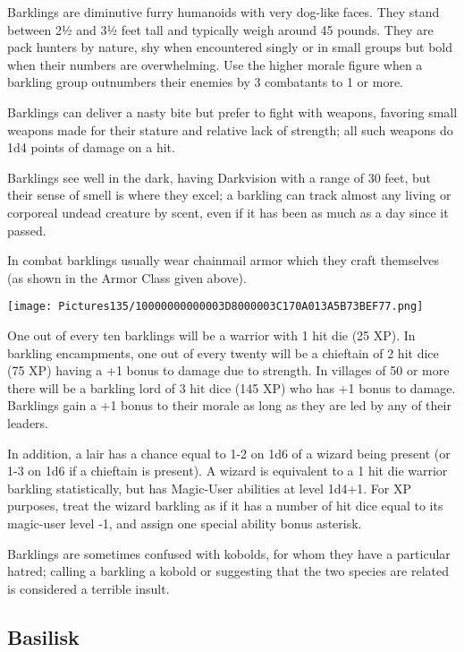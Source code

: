 \documentclass[a4paper,twoside,openany,10pt]{book}
\begin{document}
\begin{multicols}{2}
Barklings are diminutive furry humanoids with very dog-like faces. They stand between 2½ and 3½ feet tall and typically weigh around 45 pounds. They are pack hunters by nature, shy when encountered singly or in small groups but bold when their numbers are overwhelming. Use the higher morale figure when a barkling group outnumbers their enemies by 3 combatants to 1 or more.

Barklings can deliver a nasty bite but prefer to fight with weapons, favoring small weapons made for their stature and relative lack of strength; all such weapons do 1d4 points of damage on a hit. 

Barklings see well in the dark, having Darkvision with a range of 30 feet, but their sense of smell is where they excel; a barkling can track almost any living or corporeal undead creature by scent, even if it has been as much as a day since it passed.

In combat barklings usually wear chainmail armor which they craft themselves (as shown in the Armor Class given above).


\begin{center}
	\texttt{[image: Pictures135/10000000000003D8000003C170A013A5B73BEF77.png]}
\end{center}


One out of every ten barklings will be a warrior with 1 hit die (25 XP). In barkling encampments, one out of every twenty will be a chieftain of 2 hit dice (75 XP) having a +1 bonus to damage due to strength. In villages of 50 or more there will be a barkling lord of 3 hit dice (145 XP) who has +1 bonus to damage. Barklings gain a +1 bonus to their morale as long as they are led by any of their leaders.

In addition, a lair has a chance equal to 1-2 on 1d6 of a wizard being present (or 1-3 on 1d6 if a chieftain is present). A wizard is equivalent to a 1 hit die warrior barkling statistically, but has Magic-User abilities at level 1d4+1. For XP purposes, treat the wizard barkling as if it has a number of hit dice equal to its magic-user level ‑1, and assign one special ability bonus asterisk.

Barklings are sometimes confused with kobolds, for whom they have a particular hatred; calling a barkling a kobold or suggesting that the two species are related is considered a terrible insult.\\

\subsection*{Basilisk}\label{basilisk}


\end{multicols}
\end{document}
